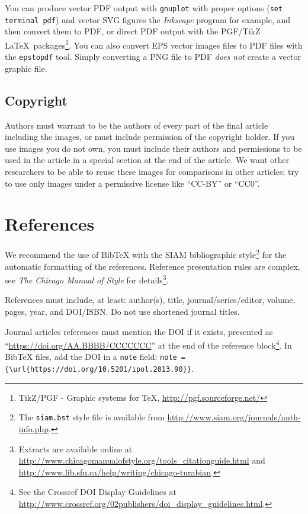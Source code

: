 \documentclass{ipol}
\begin{document}
You can produce vector PDF output with \verb|gnuplot| with proper options
(\verb|set terminal pdf|) and vector SVG figures the \emph{Inkscape}
program for example, and then convert them to PDF, or direct PDF output with
the PGF/TikZ \LaTeX\ packages\footnote{TikZ/PGF - Graphic systems for
  TeX, \url{http://pgf.sourceforge.net/}}. You can also convert EPS
vector images files to PDF files with the \verb|epstopdf| tool.
Simply converting a PNG file to PDF \emph{does not} create a vector
graphic file.

\subsection{Copyright}

Authors must warrant to be the authors of every part of the final
article including the images, or must include permission of the
copyright holder. If you use images you do not own, you must include
their authors and permissions to be used in the article in a special
section at the end of the article. We want other researchers to be
able to reuse these images for comparisons in other articles; try to
use only images under a permissive license like ``CC-BY'' or ``CC0''.

\section{References}

We recommend the use of BibTeX with the SIAM bibliographic
style\footnote{The \verb|siam.bst| style file is available from
  \url{http://www.siam.org/journals/auth-info.php}.} for the automatic
formatting of the references. Reference presentation rules are
complex, see \emph{The Chicago Manual of Style} for
details\footnote{Extracts are available online at
  \url{http://www.chicagomanualofstyle.org/tools_citationguide.html}
  and \url{http://www.lib.sfu.ca/help/writing/chicago-turabian}.}.

References must include, at least: author(s), title,
journal/series/editor, volume, pages, year, and DOI/ISBN\@. Do
not use shortened journal titles.

Journal articles references must mention the DOI if it exists, presented
as ``\url{https://doi.org/AA.BBBB/CCCCCCC}'' at the end of the
reference block\footnote{See the Crossref DOI Display Guidelines at
  \url{http://www.crossref.org/02publishers/doi\_display\_guidelines.html}.}.
In BibTeX files, add the DOI in a \verb|note| field: \verb|note = {\url{https://doi.org/10.5201/ipol.2013.90}}|.
\end{document}
